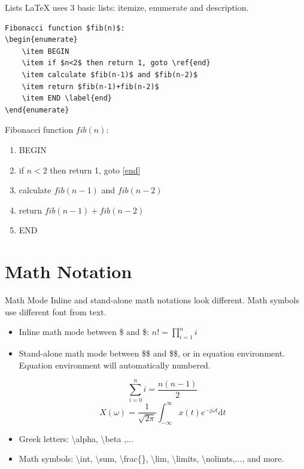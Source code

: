 \documentclass[10pt,t]{beamer}
\begin{document}
\begin{frame}[fragile]{Lists}
    \LaTeX{} uses 3 basic lists: itemize, enumerate and description.

\begin{lstlisting}[language={[LaTeX]TeX},keywordstyle=\color{red}]
Fibonacci function $fib(n)$:
\begin{enumerate}
    \item BEGIN
    \item if $n<2$ then return 1, goto \ref{end}
    \item calculate $fib(n-1)$ and $fib(n-2)$
    \item return $fib(n-1)+fib(n-2)$
    \item END \label{end}
\end{enumerate}
\end{lstlisting}

\begin{boxedminipage}{0.8\textwidth}
    Fibonacci function $fib(n)$:
\begin{enumerate}
    \item BEGIN
    \item if $n<2$ then return 1, goto \ref{end}
    \item calculate $fib(n-1)$ and $fib(n-2)$
    \item return $fib(n-1)+fib(n-2)$
    \item END \label{end}
\end{enumerate}
    \end{boxedminipage}
\end{frame}

\section{Math Notation}
\begin{frame}{Math Mode}
    Inline and stand-alone math notations look different. Math symbols
    use different font from text.
\begin{itemize}
    \item Inline math mode between \$ and \$: $n!=\prod_{i=1}^n i$
    \item Stand-alone math mode between \$\$ and \$\$, or in
        \alert{equation} environment. Equation environment will
		automatically numbered.

		\begin{equation}\label{equ:xxx}
            \sum_{i=0}^n i = \frac{n (n-1)}{2} \nonumber
        \end{equation}
        \begin{equation}
            X(\omega) =\frac{1}{\sqrt{2\pi}} \int_{-\infty}^{\infty}
                x(t) e^{-j\omega t}\mathrm{d} t
        \end{equation}
    \item Greek letters: \textbackslash alpha, \textbackslash beta ,...
    \item Math symbols: \textbackslash int, \textbackslash sum,
        \textbackslash frac\{\}, \textbackslash lim,
        \textbackslash limits, \textbackslash nolimts,..., and more.

\end{itemize}
\end{frame}
\end{document}
